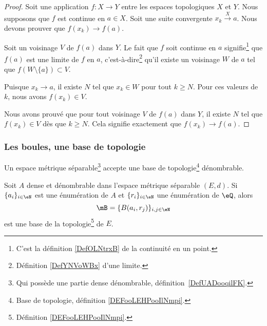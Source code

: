 \begin{proof}
	Soit une application \( f\colon X\to Y\) entre les espaces topologiques \( X\) et \( Y\). Nous supposons que \( f\) est continue en \( a\in X\). Soit une suite convergente \( x_k\stackrel{X}{\longrightarrow}a\). Nous devons prouver que \( f(x_k)\to f(a)\).

	Soit un voisinage \( V\) de \( f(a)\) dans \( Y\). Le fait que \( f\) soit continue en \( a\) signifie\footnote{C'est la définition \ref{DefOLNtrxB} de la continuité en un point.} que \( f(a)\) est une limite de \( f\) en \( a\), c'est-à-dire\footnote{Définition \ref{DefYNVoWBx} d'une limite.} qu'il existe un voisinage \( W\) de \( a\) tel que \( f(W\setminus\{ a \})\subset V\).

	Puisque \( x_k\to a\), il existe \( N\) tel que \( x_k\in W\) pour tout \( k\geq N\). Pour ces valeurs de \( k\), nous avons \( f(x_k)\in V\).

	Nous avons prouvé que pour tout voisinage \( V\) de \( f(a)\) dans \( Y\), il existe \( N\) tel que \( f(x_k)\in V\) dès que \( k\geq N\). Cela signifie exactement que \( f(x_k)\to f(a)\).
\end{proof}

\subsubsection{Les boules, une base de topologie}

\begin{proposition} \label{PropNBSooraAFr}
	Un espace métrique séparable\footnote{Qui possède une partie dense dénombrable, définition~\ref{DefUADooqilFK}.} accepte une base de topologie\footnote{Base de topologie, définition \ref{DEFooLEHPooIlNmpi}.} dénombrable.

	Soit \( A\) dense et dénombrable dans l'espace métrique séparable \( (E,d)\). Si \( \{ a_i \}_{i\in \eN}\) est une énumération de \( A\) et \( \{ r_i \}_{i\in \eN}\) une énumération de \( \eQ\), alors
	\begin{equation}
		\mB=\{ B(a_i,r_j) \}_{i,j\in \eN}
	\end{equation}
	est une base de la topologie\footnote{Définition \ref{DEFooLEHPooIlNmpi}.} de \( E\).
\end{proposition}

